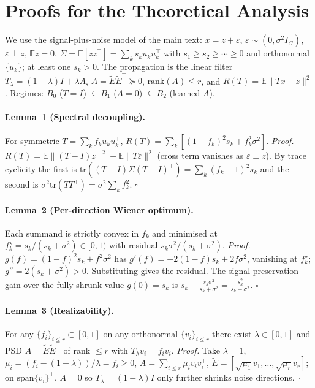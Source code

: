 \documentclass[letterpaper]{article}
\begin{document}

\section{Proofs for the Theoretical Analysis}
\label{app:proofs}
We use the signal-plus-noise model of the main text: $x=z+\varepsilon$,
$\varepsilon\sim(0,\sigma^2 I_G)$, $\varepsilon\perp z$, $\mathbb{E}z=0$,
$\Sigma=\mathbb{E}[zz^\top]=\sum_k s_k u_k u_k^\top$ with $s_1\ge s_2\ge\cdots\ge0$ and
orthonormal $\{u_k\}$; at least one $s_k>0$. The propagation is the linear filter
$T_\lambda=(1-\lambda)I+\lambda A$, $A=\tilde E\tilde E^\top\succeq0$, $\mathrm{rank}(A)\le r$,
and $R(T)=\mathbb{E}\lVert Tx-z\rVert^2$. Regimes: $B_0$ ($T{=}I$) $\subseteq B_1$ ($A{=}0$)
$\subseteq B_2$ (learned $A$).

\paragraph{Lemma~1 (Spectral decoupling).} For symmetric $T=\sum_k f_k u_ku_k^\top$,
$R(T)=\sum_k[(1-f_k)^2 s_k+f_k^2\sigma^2]$.
\emph{Proof.} $R(T)=\mathbb{E}\lVert(T-I)z\rVert^2+\mathbb{E}\lVert T\varepsilon\rVert^2$ (cross term
vanishes as $\varepsilon\perp z$). By trace cyclicity the first is
$\mathrm{tr}((T-I)\Sigma(T-I)^\top)=\sum_k(f_k-1)^2 s_k$ and the second is
$\sigma^2\mathrm{tr}(TT^\top)=\sigma^2\sum_k f_k^2$. $\square$

\paragraph{Lemma~2 (Per-direction Wiener optimum).} Each summand is strictly convex in $f_k$ and
minimised at $f_k^\star=s_k/(s_k+\sigma^2)\in[0,1)$ with residual $s_k\sigma^2/(s_k+\sigma^2)$.
\emph{Proof.} $g(f)=(1-f)^2 s_k+f^2\sigma^2$ has $g'(f)=-2(1-f)s_k+2f\sigma^2$, vanishing at
$f_k^\star$; $g''=2(s_k+\sigma^2)>0$. Substituting gives the residual. The signal-preservation
gain over the fully-shrunk value $g(0)=s_k$ is $s_k-\frac{s_k\sigma^2}{s_k+\sigma^2}=\frac{s_k^2}{s_k+\sigma^2}$. $\square$

\paragraph{Lemma~3 (Realizability).} For any $\{f_i\}_{i\le r}\subset[0,1]$ on any orthonormal
$\{v_i\}_{i\le r}$ there exist $\lambda\in[0,1]$ and PSD $A=\tilde E\tilde E^\top$ of rank $\le r$
with $T_\lambda v_i=f_i v_i$. \emph{Proof.} Take $\lambda=1$, $\mu_i=(f_i-(1-\lambda))/\lambda=f_i\ge0$,
$A=\sum_{i\le r}\mu_i v_iv_i^\top$, $\tilde E=[\sqrt{\mu_1}v_1,\dots,\sqrt{\mu_r}v_r]$; on
$\mathrm{span}\{v_i\}^\perp$, $A{=}0$ so $T_\lambda=(1-\lambda)I$ only further shrinks noise
directions. $\square$
\end{document}
